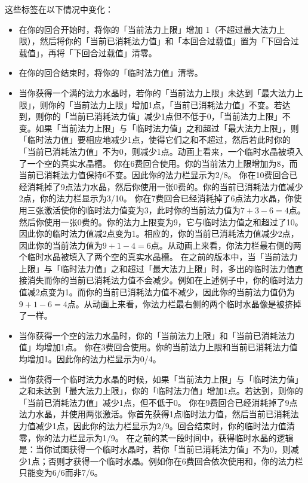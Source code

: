 这些标签在以下情况中变化：
\begin{itemize}
    \item 在你的回合开始时，将你的「当前法力上限」增加 1（不超过最大法力上限），然后将你的「当前已消耗法力值」和「本回合过载值」置为「下回合过载值」，再将「下回合过载值」清零。
    \item 在你的回合结束时，将你的「临时法力值」清零。
    \item 当你获得一个满的法力水晶时，若你的「当前法力上限」未达到「最大法力上限」，则你的「当前法力上限」增加1点，「当前已消耗法力值」不变。若达到，则你的「当前已消耗法力值」减少1点但不低于0，「当前法力上限」不变。如果「当前法力上限」与「临时法力值」之和超过「最大法力上限」，则「临时法力值」要相应地减少1点，使得它们之和不超过，然后若此时你的「当前已消耗法力值」不为0，则减少1点。动画上看来，一个临时水晶被填入了一个空的真实水晶槽。
        \example 你在6费回合使用。你的当前法力上限增加为8，而当前已消耗法力值保持6不变。因此你的法力栏显示为2/8。
        \example 你在10费回合已经消耗掉了9点法力水晶，然后你使用一张0费的。你的当前已消耗法力值减少2点，你的法力栏显示为3/10。
        \example 你在7费回合已经消耗掉了6点法力水晶，你使用三张激活使你的临时法力值变为3，此时你的当前法力值为$7+3-6=4$点。然后你使用一张0费的。你的法力上限变为9，它与临时法力值之和超过了10。因此你的临时法力值减2点变为1。相应的，你的当前已消耗法力值减少2点，因此你的当前法力值为$9+1-4=6$点。从动画上来看，你法力栏最右侧的两个临时水晶被填入了两个空的真实水晶槽。
        \history {}在之前的版本中，当「当前法力上限」与「临时法力值」之和超过「最大法力上限」时，多出的临时法力值直接消失而你的当前已消耗法力值不会减少。例如在上述例子中，你的临时法力值减2点变为1。而你的当前已消耗法力值不减少，因此你的当前法力值仍为$9+1-6=4$点。从动画上来看，你法力栏最右侧的两个临时水晶像是被挤掉了一样。
    \item 当你获得一个空的法力水晶时，你的「当前法力上限」和「当前已消耗法力值」均增加1点。
        \example 你在3费回合使用。你的当前法力上限和当前已消耗法力值均增加1。因此你的法力栏显示为0/4。
    \item 当你获得一个临时法力水晶的时候，如果「当前法力上限」与「临时法力值」之和未达到「最大法力上限」，你的「临时法力值」增加1点。若达到，则你的「当前已消耗法力值」减少1点，但不低于0。
        \example 你在9费回合已经消耗掉了9点法力水晶，并使用两张激活。你首先获得1点临时法力值，然后当前已消耗法力值减少1点，因此你的法力栏显示为2/9。回合结束时，你的临时法力值清零，你的法力栏显示为1/9。
        \history {}在之前的某一段时间中，获得临时水晶的逻辑是：当你试图获得一个临时水晶时，若你「当前已消耗法力值」不为0，则减少1点；否则才获得一个临时水晶。例如你在6费回合依次使用和，你的法力栏只能变为6/6而非7/6。

\end{itemize}
